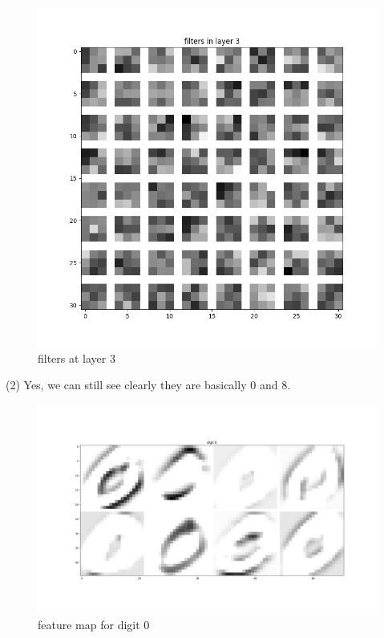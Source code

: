 \documentclass[12pt]{article}
\begin{document}
\begin{figure}[h]
    \centering
    \includegraphics [scale=0.5]{filters_layer3.png}
    \caption {filters at layer 3}
\end{figure}
\clearpage

(2) Yes, we can still see clearly they are basically $0$ and $8$. 
\begin{figure}[h]
    \centering
    \includegraphics [scale=0.3]{digit0.png}
    \caption {feature map for digit 0}
\end{figure}
\end{document}
